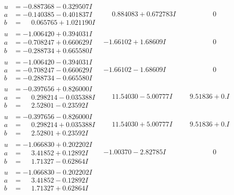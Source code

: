 \documentclass[1p]{elsarticle_modified}
\theoremstyle{definition}
\begin{document}
$$\begin{array}{c|c|c}
\begin{aligned}
u &= -0.887368 - 0.329507 I \\
a &= -0.140385 - 0.401837 I \\
b &= \phantom{-}0.065765 + 1.021190 I\end{aligned}
 & \phantom{-}0.884083 + 0.672783 I & \phantom{-0.000000 } 0 \\ \hline\begin{aligned}
u &= -1.006420 + 0.394031 I \\
a &= -0.708247 + 0.660629 I \\
b &= -0.288734 + 0.665580 I\end{aligned}
 & -1.66102 + 1.68609 I & \phantom{-0.000000 } 0 \\ \hline\begin{aligned}
u &= -1.006420 - 0.394031 I \\
a &= -0.708247 - 0.660629 I \\
b &= -0.288734 - 0.665580 I\end{aligned}
 & -1.66102 - 1.68609 I & \phantom{-0.000000 } 0 \\ \hline\begin{aligned}
u &= -0.397656 + 0.826000 I \\
a &= \phantom{-}0.298214 - 0.035388 I \\
b &= \phantom{-}2.52801 - 0.23592 I\end{aligned}
 & \phantom{-}11.54030 - 5.00777 I & \phantom{-}9.51836 + 0. I\phantom{ +0.000000I} \\ \hline\begin{aligned}
u &= -0.397656 - 0.826000 I \\
a &= \phantom{-}0.298214 + 0.035388 I \\
b &= \phantom{-}2.52801 + 0.23592 I\end{aligned}
 & \phantom{-}11.54030 + 5.00777 I & \phantom{-}9.51836 + 0. I\phantom{ +0.000000I} \\ \hline\begin{aligned}
u &= -1.066830 + 0.202202 I \\
a &= \phantom{-}3.41852 + 0.12892 I \\
b &= \phantom{-}1.71327 - 0.62864 I\end{aligned}
 & -1.00370 - 2.82785 I & \phantom{-0.000000 } 0 \\ \hline\begin{aligned}
u &= -1.066830 - 0.202202 I \\
a &= \phantom{-}3.41852 - 0.12892 I \\
b &= \phantom{-}1.71327 + 0.62864 I\end{aligned}

\end{array}$$
\end{document}
